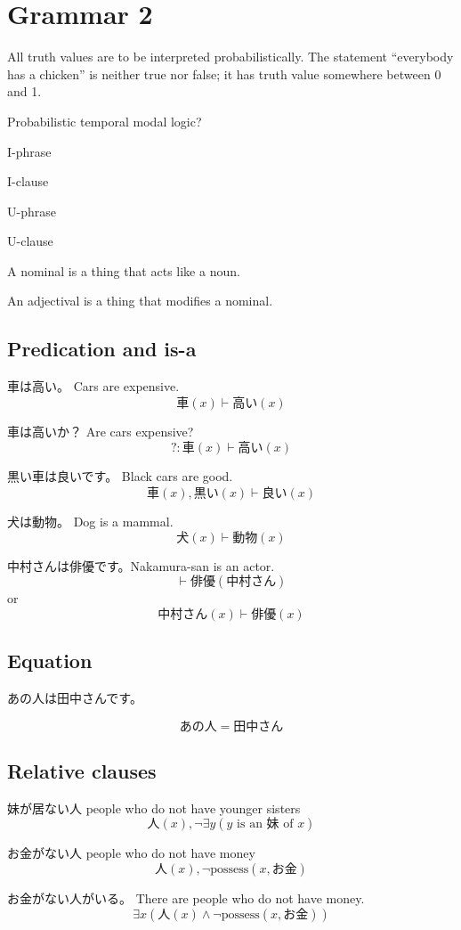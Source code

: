 \chapter{Grammar 2}

All truth values are to be interpreted probabilistically.
The statement ``everybody has a chicken'' is neither true nor false;
it has truth value somewhere between 0 and 1.

Probabilistic temporal modal logic?

I-phrase

I-clause

U-phrase

U-clause

A nominal is a thing that acts like a noun.

An adjectival is a thing that modifies a nominal.

\section{Predication and is-a}

車は高い。
Cars are expensive.
\[
    車(x) \vdash 高い(x)
\]

車は高いか？
Are cars expensive?
\[
    ? : 車(x) \vdash 高い(x)
\]

黒い車は良いです。
Black cars are good.
\[
    車(x), 黒い(x) \vdash 良い(x)
\]

犬は動物。
Dog is a mammal.
\[
    犬(x) \vdash 動物(x)
\]

中村さんは俳優です。Nakamura-san is an actor.
\[
    \vdash 俳優(中村さん)
\]
or
\[
    中村さん(x) \vdash 俳優(x)
\]

\section{Equation}

あの人は田中さんです。

\[
    あの人 = 田中さん
\]

\section{Relative clauses}

妹が居ない人
people who do not have younger sisters
\[
    人(x), \neg \exists y (y \text{ is an 妹 of } x)
\]

お金がない人
people who do not have money
\[
    人(x), \neg \text{possess}(x,お金)
\]

お金がない人がいる。
There are people who do not have money.
\[
    \exists x (人(x) \wedge \neg \text{possess}(x,お金))
\]

